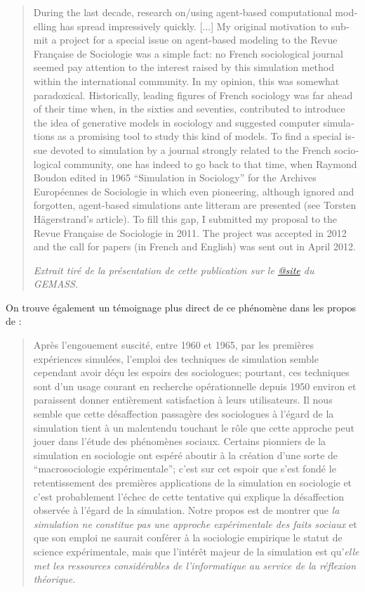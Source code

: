 \foreignblockquote{english}[\textit{Extrait tiré de la présentation de cette publication sur le \href{http://www.gemass.org/manzo/writing-agent-based-computational-modeling}{@site} du GEMASS.}]{During the last decade, research on/using agent-based computational modelling has spread impressively quickly. [...] My original motivation to submit a project for a special issue on agent-based modeling to the Revue Française de Sociologie was a simple fact: no French sociological journal seemed pay attention to the interest raised by this simulation method within the international community. In my opinion, this was somewhat paradoxical. Historically, leading figures of French sociology was far ahead of their time when, in the sixties and seventies, contributed to introduce the idea of generative models in sociology and suggested computer simulations as a promising tool to study this kind of models. To find a special issue devoted to simulation by a journal strongly related to the French sociological community, one has indeed to go back to that time, when Raymond Boudon edited in 1965 \enquote{Simulation in Sociology} for the Archives Européennes de Sociologie in which even pioneering, although ignored and forgotten, agent-based simulations ante litteram are presented (see Torsten Hägerstrand’s article). To fill this gap, I submitted my proposal to the Revue Française de Sociologie in 2011. The project was accepted in 2012 and the call for papers (in French and English) was sent out in April 2012.} 

On trouve également un témoignage plus direct de ce phénomène dans les propos de \textcite{Gremy1971} :

\blockquote[\cite{Gremy1971}]{Après l'engouement suscité, entre 1960 et 1965, par les premières expériences simulées, l'emploi des techniques de simulation semble cependant avoir déçu les espoirs des sociologues; pourtant, ces techniques sont d'un usage courant en recherche opérationnelle depuis 1950 environ et paraissent donner entièrement satisfaction à leurs utilisateurs. Il nous semble que cette désaffection passagère des sociologues à l'égard de la simulation tient à un malentendu touchant le rôle que cette approche peut jouer dans l'étude des phénomènes sociaux. Certains pionniers de la simulation en sociologie ont espéré aboutir à la création d'une sorte de \enquote{macrosociologie expérimentale}; c'est sur cet espoir que s'est fondé le retentissement des premières applications de la simulation en sociologie et c'est probablement l'échec de cette tentative qui explique la désaffection observée à l'égard de la simulation. Notre propos est de montrer que \textit{la simulation ne constitue pas une approche expérimentale des faits sociaux} et que son emploi ne saurait conférer à la sociologie empirique le statut de science expérimentale, mais que l'intérêt majeur de la simulation est qu'\textit{elle met les ressources considérables de l'informatique au service de la réflexion théorique.}}

